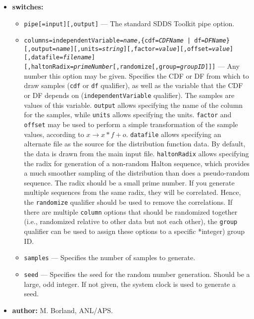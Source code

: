 \begin{itemize}
\item {\bf switches:}
    \begin{itemize}
    \item \verb|pipe[=input][,output]| --- The standard SDDS Toolkit pipe option.
    \item {\tt columns=independentVariable={\em name},\{cdf={\em CDFName} | df={\em DFName}\}
[,output={\em name}][,units={\em string}][,factor={\em value}][,offset={\em value}]
[,datafile={\em filename}][,haltonRadix={\em primeNumber}[,randomize[,group={\em groupID}]]]} ---
   Any number this option may be given.
   Specifies the CDF or DF from which to draw samples ({\tt cdf} or {\tt df} qualifier), 
   as well as the variable that the CDF or
   DF depends on ({\tt independentVariable} qualifier).  The samples are values of this variable.
   {\tt output} allows specifying the name of the column for the samples, while {\tt units}
   allows specifying the units.  {\tt factor} and {\tt offset} may be used to perform a simple
   transformation of the sample values, according to $x \rightarrow x*f+o $.
   {\tt datafile} allows specifying an alternate file as the source for the distribution function
   data.  By default, the data is drawn from the main input file.
   {\tt haltonRadix} allows specifying the radix for generation of a non-random Halton sequence,
   which provides a much smoother sampling of the distribution than does a pseudo-random sequence.
   The radix should be a small prime number.  If you generate multiple sequences from the
   same radix, they will be correlated.  Hence, the {\tt randomize} qualifier should be used
   to remove the correlations.  If there are multiple {\tt column} options that should be
   randomized together (i.e., randomized relative to other data but not each other), the 
   {\tt group} qualifier can be used to assign these options to a specific *integer) group ID.
   \item \verb|samples| --- Specifies the number of samples to generate.
   \item \verb|seed| --- Specifies the seed for the random number generation.  Should be a large,
        odd integer.  If not given, the system clock is used to generate a seed.
    \end{itemize}
\item {\bf author:} M. Borland, ANL/APS.
\end{itemize}


